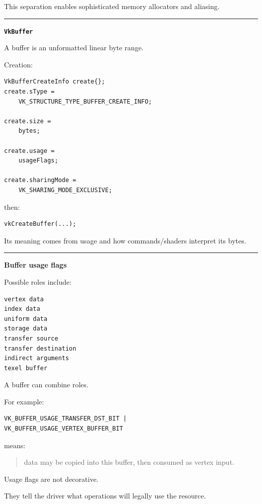 This separation enables sophisticated memory allocators and aliasing.

\begin{center}\rule{0.5\linewidth}{0.5pt}\end{center}

\textbf{\texttt{VkBuffer}}

A buffer is an unformatted linear byte range.

Creation:

\begin{verbatim}
VkBufferCreateInfo create{};
create.sType =
    VK_STRUCTURE_TYPE_BUFFER_CREATE_INFO;

create.size =
    bytes;

create.usage =
    usageFlags;

create.sharingMode =
    VK_SHARING_MODE_EXCLUSIVE;
\end{verbatim}

then:

\begin{verbatim}
vkCreateBuffer(...);
\end{verbatim}

Its meaning comes from usage and how commands/shaders interpret its bytes.

\begin{center}\rule{0.5\linewidth}{0.5pt}\end{center}

\textbf{Buffer usage flags}

Possible roles include:

\begin{verbatim}
vertex data
index data
uniform data
storage data
transfer source
transfer destination
indirect arguments
texel buffer
\end{verbatim}

A buffer can combine roles.

For example:

\begin{verbatim}
VK_BUFFER_USAGE_TRANSFER_DST_BIT |
VK_BUFFER_USAGE_VERTEX_BUFFER_BIT
\end{verbatim}

means:

\begin{quote}
data may be copied into this buffer, then consumed as vertex input.
\end{quote}

Usage flags are not decorative.

They tell the driver what operations will legally use the resource.

